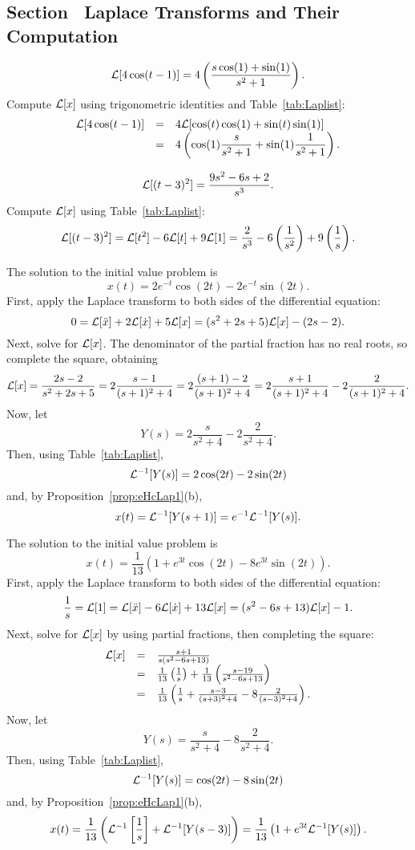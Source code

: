 \subsection*{Section~\protect{\ref{S:13.3}} Laplace Transforms and Their Computation}

 \ans
\[
{\cal L}[4\cos(t - 1)] =
4\left(\frac{s\cos(1) + \sin(1)}{s^2 + 1}\right).
\]
\soln Compute ${\cal L}[x]$ using trigonometric identities and
Table~\ref{tab:Laplist}:
\[
\begin{array}{rcl}
{\cal L}[4\cos(t - 1)]
& = & 4{\cal L}[\cos(t)\cos(1) + \sin(t)\sin(1)] \\
& = & \displaystyle 4\left(\cos(1)\frac{s}{s^2 + 1} + \sin(1)\frac{1}{s^2 + 1}\right).
\end{array}
\]

 \ans
\[
{\cal L}[(t - 3)^2] = \frac{9s^2 - 6s + 2}{s^3}.
\]
\soln Compute ${\cal L}[x]$ using Table~\ref{tab:Laplist}:
\[
{\cal L}[(t - 3)^2] = {\cal L}[t^2] - 6{\cal L}[t] + 9{\cal L}[1]
= \frac{2}{s^3} - 6\left(\frac{1}{s^2}\right) + 9\left(\frac{1}{s}
\right).
\]

 \ans The solution to the initial value problem is
\[
x(t) = 2e^{-t}\cos(2t) - 2e^{-t}\sin(2t).
\]
\soln First, apply the Laplace transform to both sides of the differential
equation:
\[
0 = {\cal L}[\ddot{x}] + 2{\cal L}[\dot{x}] + 5{\cal L}[x]
= (s^2 + 2s + 5){\cal L}[x] - (2s - 2).
\]
Next, solve for ${\cal L}[x]$.  The denominator of the partial fraction
has no real roots, so complete the square, obtaining
\[
{\cal L}[x]
= \frac{2s - 2}{s^2 + 2s + 5}
= 2\frac{s - 1}{(s + 1)^2 + 4}
= 2\frac{(s + 1) - 2}{(s + 1)^2 + 4}
= 2\frac{s + 1}{(s + 1)^2 + 4} - 2\frac{2}{(s + 1)^2 + 4}.
\]
Now, let
\[
Y(s) = 2\frac{s}{s^2 + 4} - 2\frac{2}{s^2 + 4}.
\]
Then, using Table~\ref{tab:Laplist},
\[
{\cal L}^{-1}[Y(s)] = 2\cos(2t) - 2\sin(2t)
\]
and, by Proposition~\ref{prop:eHcLap1}(b),
\[
x(t) = {\cal L}^{-1}[Y(s + 1)] = e^{-1}{\cal L}^{-1}[Y(s)].
\]

 \ans The solution to the initial value problem is
\[
x(t) = \frac{1}{13}\left(1 + e^{3t}\cos(2t) - 8e^{3t}\sin(2t)\right).
\]
\soln First, apply the Laplace transform to both sides of the differential
equation:
\[
\frac{1}{s} = {\cal L}[1]
= {\cal L}[\ddot{x}] - 6{\cal L}[\dot{x}] + 13{\cal L}[x]
= (s^2 - 6s + 13){\cal L}[x] - 1.
\]
Next, solve for ${\cal L}[x]$ by using partial fractions, then completing
the square:
\[
\begin{array}{rcl}
{\cal L}[x] & = & \frac{s + 1}{s(s^2 - 6s + 13)} \\
& = & \frac{1}{13}\left(\frac{1}{s}\right) +
\frac{1}{13}\left(\frac{s - 19}{s^2 - 6s + 13}\right) \\
& = & \frac{1}{13}\left(\frac{1}{s} +
\frac{s - 3}{(s + 3)^2 + 4} - 8\frac{2}{(s - 3)^2 + 4}\right).
\end{array}
\]
Now, let
\[
Y(s) = \frac{s}{s^2 + 4} - 8\frac{2}{s^2 + 4}.
\]
Then, using Table~\ref{tab:Laplist},
\[
{\cal L}^{-1}[Y(s)] = \cos(2t) - 8\sin(2t)
\]
and, by Proposition~\ref{prop:eHcLap1}(b),
\[
x(t) = \frac{1}{13}\left({\cal L}^{-1}\left[\frac{1}{s}\right] +
{\cal L}^{-1}[Y(s - 3)]\right) =
\frac{1}{13}\left(1 + e^{3t}{\cal L}^{-1}[Y(s)]\right).
\]

